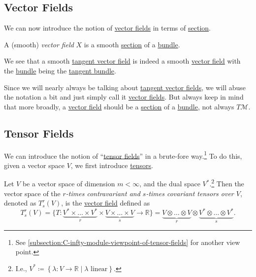 \subsection{Vector Fields}
We can now introduce the notion of \hyperref[def:vector-field]{vector fields} in terms of \hyperref[def:section]{section}.

\begin{definition}\label{def:vector-field*}
	A (smooth) \emph{vector field} \(X\) is a smooth \hyperref[def:section]{section} of a \hyperref[def:bundle]{bundle}.
\end{definition}

\begin{note}
	We see that a smooth \hyperref[def:vector-field]{tangent vector field} is indeed a smooth \hyperref[def:vector-field*]{vector field} with the \hyperref[def:bundle]{bundle} being the \hyperref[def:tangent-bundle]{tangent bundle}.
\end{note}

\begin{notation}
	Since we will nearly always be talking about \hyperref[def:vector-field]{tangent vector fields}, we will abuse the notation a bit and just simply call it \hyperref[def:vector-field]{vector fields}. But always keep in mind that more broadly, a \hyperref[def:vector-field*]{vector field} should be a \hyperref[def:section]{section} of a \hyperref[def:bundle]{bundle}, not always \(T \mathcal{M} \).
\end{notation}

\subsection{Tensor Fields}
We can introduce the notion of ``\hyperref[def:tensor-field]{tensor fields}'' in a brute-fore way.\footnote{See \autoref{subsection:C-infty-module-viewpoint-of-tensor-fields} for another view point.} To do this, given a vector space \(V\), we first introduce \hyperref[def:tensor]{tensors}.

\begin{definition}[Tensor]\label{def:tensor}
	Let \(V\) be a vector space of dimension \(m < \infty \), and the dual space \(V^{\ast}\).\footnote{I.e., \(V^{\ast} \coloneqq \left\{ \lambda \colon V \to \mathbb{R} \mid \lambda \text{ linear} \right\} \).} Then the vector space of the \emph{\(r\)-times contravariant and \(s\)-times covariant tensors over \(V\)}, denoted as \(T_s^r(V) \), is the \hyperref[def:vector-field]{vector field} defined as
	\[
		T_s^r(V) = \{ T\colon \underbrace{V^{\ast} \times \ldots \times V^{\ast} }_{r} \times \underbrace{V\times \ldots \times V}_{s} \to \mathbb{R} \}
		= \underbrace{V \otimes \ldots \otimes V}_{r} \otimes \underbrace{V^{\ast} \otimes \ldots \otimes V^{\ast} }_{s}.
	\]
\end{definition}

